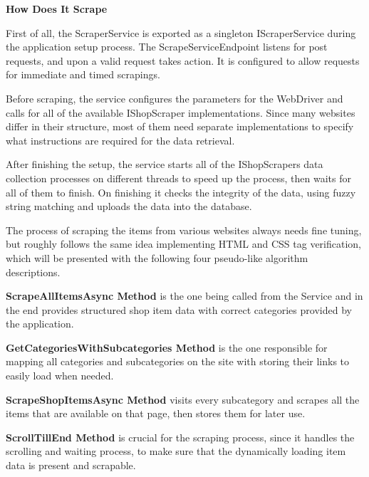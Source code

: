 \noindent\textbf{How Does It Scrape}

First of all, the ScraperService is exported as a singleton IScraperService during the application setup process. The ScrapeServiceEndpoint listens for post requests, and upon a valid request takes action. It is configured to allow requests for immediate and timed scrapings. 

Before scraping, the service configures the parameters for the WebDriver and calls for all of the available IShopScraper implementations. Since many websites differ in their structure, most of them need separate implementations to specify what instructions are required for the data retrieval. 

After finishing the setup, the service starts all of the IShopScrapers data collection processes on different threads to speed up the process, then waits for all of them to finish. On finishing it checks the integrity of the data, using fuzzy string matching and uploads the data into the database.

The process of scraping the items from various websites always needs fine tuning, but roughly follows the same idea implementing HTML and CSS tag verification, which will be presented with the following four pseudo-like algorithm descriptions.


\noindent\textbf{ScrapeAllItemsAsync Method} is the one being called from the Service and in the end provides structured shop item data with correct categories provided by the application.

\noindent\textbf{GetCategoriesWithSubcategories Method} is the one responsible for mapping all categories and subcategories on the site with storing their links to easily load when needed.

\noindent\textbf{ScrapeShopItemsAsync Method} visits every subcategory and scrapes all the items that are available on that page, then stores them for later use.

\noindent\textbf{ScrollTillEnd Method} is crucial for the scraping process, since it handles the scrolling and waiting process, to make sure that the dynamically loading item data is present and scrapable.

